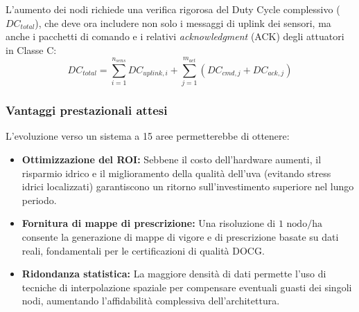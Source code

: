\noindent L'aumento dei nodi richiede una verifica rigorosa del Duty Cycle complessivo ($DC_{total}$), che deve ora includere non solo i messaggi di uplink dei sensori, ma anche i pacchetti di comando e i relativi \textit{acknowledgment} (ACK) degli attuatori in Classe C:
\begin{equation}
	DC_{total} = \sum_{i=1}^{n_{sens}} DC_{uplink,i} + \sum_{j=1}^{m_{act}} (DC_{cmd,j} + DC_{ack,j})
\end{equation}

\subsubsection{Vantaggi prestazionali attesi}
L'evoluzione verso un sistema a 15 aree permetterebbe di ottenere:
\begin{itemize}
	\item \textbf{Ottimizzazione del ROI:} Sebbene il costo dell'hardware aumenti, il risparmio idrico e il miglioramento della qualità dell'uva (evitando stress idrici localizzati) garantiscono un ritorno sull'investimento superiore nel lungo periodo.
	\item \textbf{Fornitura di mappe di prescrizione:} Una risoluzione di $1\text{ nodo/ha}$ consente la generazione di mappe di vigore e di prescrizione basate su dati reali, fondamentali per le certificazioni di qualità DOCG.
	\item \textbf{Ridondanza statistica:} La maggiore densità di dati permette l'uso di tecniche di interpolazione spaziale per compensare eventuali guasti dei singoli nodi, aumentando l'affidabilità complessiva dell'architettura.
\end{itemize}


